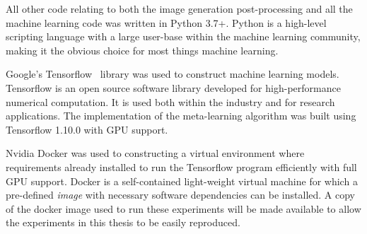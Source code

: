 All other code relating to both the image generation post-processing and all the machine learning code was written in Python 3.7+. Python is a high-level scripting language with a large user-base within the machine learning community, making it the obvious choice for most things machine learning. 

Google's Tensorflow~\cite{tensorflow} library was used to construct machine learning models. Tensorflow is an open source software library developed for high-performance numerical computation. It is used both within the industry and for research applications. The implementation of the meta-learning algorithm was built using Tensorflow 1.10.0 with GPU support.

Nvidia Docker was used to constructing a virtual environment where requirements already installed to run the Tensorflow program efficiently with full GPU support. Docker is a self-contained light-weight virtual machine for which a pre-defined \textit{image} with necessary software dependencies can be installed. A copy of the docker image used to run these experiments will be made available to allow the experiments in this thesis to be easily reproduced.